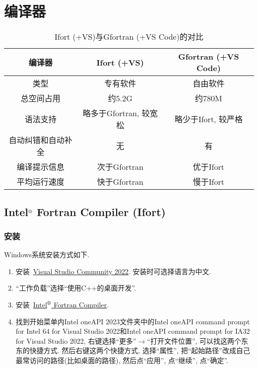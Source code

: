 \chapter{编译器}\label{fortran_compiler}
\def\r{${}^\text{\textregistered}$}

\begin{table}[!htbp]
    \centering
    \begin{tabular}{|c|c|c|}
        \hline
        编译器&Ifort (+VS)&Gfortran (+VS Code)\\
        \hline
        类型&专有软件&自由软件\\
        \hline
        总空间占用&约5.2G&约780M\\
        \hline
        语法支持&略多于Gfortran, 较宽松&略少于Ifort, 较严格\\
        \hline
        自动纠错和自动补全&无&有\\
        \hline
        编译提示信息&次于Gfortran&优于Ifort\\
        \hline
        平均运行速度&快于Gfortran&慢于Ifort\\
        \hline
    \end{tabular}
    \caption{Ifort (+VS)与Gfortran (+VS Code)的对比}
\end{table}

\section[Intel\r{} Fortran Compiler]{Intel\r{} Fortran Compiler (Ifort)}

\subsection{安装}

Windows系统安装方式如下.
\begin{enumerate}
    \item 安装~\href{https://visualstudio.microsoft.com/zh-hans/thank-you-downloading-visual-studio/?sku=Community&channel=Release&version=VS2022&source=VSLandingPage&cid=2030&passive=false}
    {Visual Studio Community 2022}. 安装时可选择语言为中文.
    \item ``工作负载''选择``使用C++的桌面开发''.
    \item 安装~\href{https://registrationcenter-download.intel.com/akdlm/IRC_NAS/1720594b-b12c-4aca-b7fb-a7d317bac5cb/w_fortran-compiler_p_2023.2.1.7.exe}
    {Intel\r{} Fortran Compiler}.
    \item 找到开始菜单内Intel oneAPI 2023文件夹中的Intel oneAPI command prompt for Intel 64 for Visual Studio 2022和Intel oneAPI command prompt for IA32 for Visual Studio 2022, 右键选择``更多''$\rightarrow$``打开文件位置'', 可以找这两个东东的快捷方式. 然后右键这两个快捷方式, 选择``属性'', 把``起始路径''改成自己最常访问的路径(比如桌面的路径), 然后点``应用'', 点``继续'', 点``确定''.
\end{enumerate}

